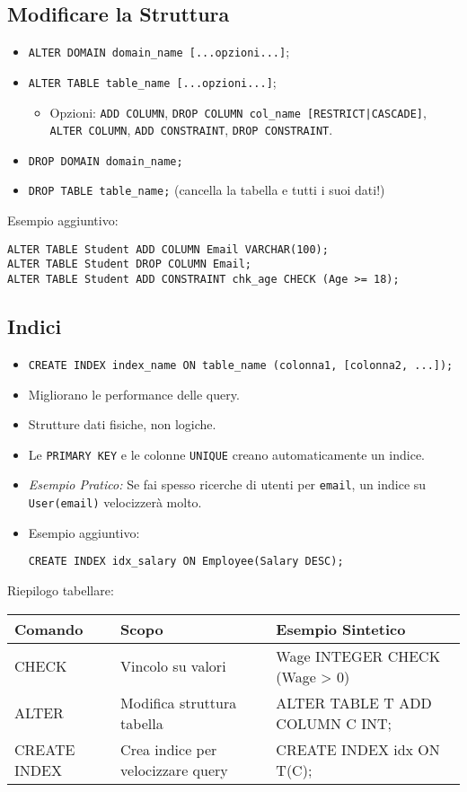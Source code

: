 \subsection{Modificare la Struttura}
\begin{itemize}
	\item \texttt{ALTER DOMAIN domain\_name [...opzioni...]};
	\item \texttt{ALTER TABLE table\_name [...opzioni...]};
	\begin{itemize}
		\item Opzioni: \texttt{ADD COLUMN}, \texttt{DROP COLUMN col\_name [RESTRICT|CASCADE]}, \texttt{ALTER COLUMN}, \texttt{ADD CONSTRAINT}, \texttt{DROP CONSTRAINT}.
	\end{itemize}
	\item \texttt{DROP DOMAIN domain\_name;}
	\item \texttt{DROP TABLE table\_name;} (cancella la tabella e tutti i suoi dati!)
\end{itemize}
Esempio aggiuntivo:
\begin{verbatim}
ALTER TABLE Student ADD COLUMN Email VARCHAR(100);
ALTER TABLE Student DROP COLUMN Email;
ALTER TABLE Student ADD CONSTRAINT chk_age CHECK (Age >= 18);
\end{verbatim}

\subsection{Indici}
\begin{itemize}
	\item \texttt{CREATE INDEX index\_name ON table\_name (colonna1, [colonna2, ...]);}
	\item Migliorano le performance delle query.
	\item Strutture dati fisiche, non logiche.
	\item Le \texttt{PRIMARY KEY} e le colonne \texttt{UNIQUE} creano automaticamente un indice.
	\item \textit{Esempio Pratico:} Se fai spesso ricerche di utenti per \texttt{email}, un indice su \texttt{User(email)} velocizzerà molto.
	\item Esempio aggiuntivo:
	\begin{verbatim}
CREATE INDEX idx_salary ON Employee(Salary DESC);
	\end{verbatim}
\end{itemize}

Riepilogo tabellare:
\begin{center}
\begin{tabular}{|l|l|l|}
\hline
\textbf{Comando} & \textbf{Scopo} & \textbf{Esempio Sintetico} \\
\hline
CHECK & Vincolo su valori & Wage INTEGER CHECK (Wage > 0) \\
ALTER & Modifica struttura tabella & ALTER TABLE T ADD COLUMN C INT; \\
CREATE INDEX & Crea indice per velocizzare query & CREATE INDEX idx ON T(C); \\
\hline
\end{tabular}
\end{center}

